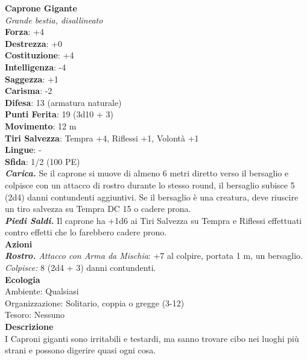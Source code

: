 \begin{multicols}{2}
\medskip\textbf{Caprone Gigante}\\
\emph{Grande bestia, disallineato}\\
\textbf{Forza}: +4\\
\textbf{Destrezza}: +0\\
\textbf{Costituzione}: +4\\
\textbf{Intelligenza}: -4\\
\textbf{Saggezza}: +1\\
\textbf{Carisma}: -2\\
\textbf{Difesa}: 13 (armatura naturale)\\
\textbf{Punti Ferita}: 19 (3d10 + 3)\\
\textbf{Movimento}: 12 m\\
\textbf{Tiri Salvezza}: Tempra +4, Riflessi +1, Volontà +1 \\
\textbf{Lingue}: -\\
\textbf{Sfida}: 1/2 (100 PE)\smallskip\\
\emph{\textbf{Carica.}} Se il caprone si muove di almeno 6 metri diretto verso il bersaglio e colpisce con un attacco di rostro durante lo stesso round, il bersaglio subisce 5 (2d4) danni contundenti aggiuntivi. Se il bersaglio è una creatura, deve riuscire un tiro salvezza su Tempra DC  15 o cadere prona.\\
\emph{\textbf{Piedi Saldi.}} Il caprone ha +1d6 ai Tiri Salvezza su Tempra e Riflessi effettuati contro effetti che lo farebbero cadere prono.\\
\smallskip\textbf{Azioni}\\
\emph{\textbf{Rostro.} Attacco con Arma da Mischia}: +7 al colpire, portata 1 m, un bersaglio.\\
\emph{Colpisce:} 8 (2d4 + 3) danni contundenti.\\
\textbf{Ecologia}\\
Ambiente: Qualsiasi\\
Organizzazione: Solitario, coppia o gregge (3-12)\\
Tesoro: Nessuno\\
\textbf{Descrizione}\\
I Caproni giganti sono irritabili e testardi, ma sanno trovare cibo nei luoghi più strani e possono digerire quasi ogni cosa. \\


\end{multicols}
